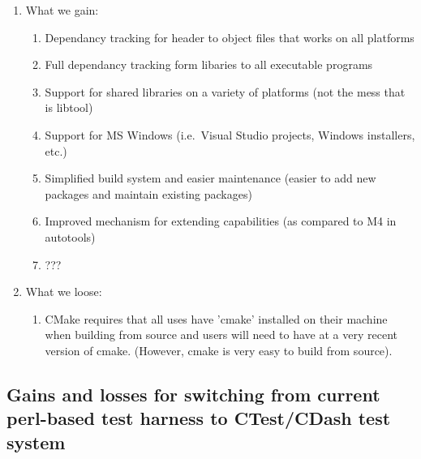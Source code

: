 \documentclass[pdf,ps2pdf,11pt]{SANDreport}
\begin{document}
\begin{enumerate}

{}\item What we gain:

  \begin{enumerate}

  {}\item Dependancy tracking for header to object files that works on
  all platforms

  {}\item Full dependancy tracking form libaries to all executable
  programs

  {}\item Support for shared libraries on a variety of platforms (not
  the mess that is libtool)

  {}\item Support for MS Windows (i.e.\ Visual Studio projects,
  Windows installers, etc.)

  {}\item Simplified build system and easier maintenance (easier to
  add new packages and maintain existing packages)

  {}\item Improved mechanism for extending capabilities (as compared
  to M4 in autotools)

  {}\item ???

  \end{enumerate}

{}\item What we loose:

  \begin{enumerate}

  {}\item CMake requires that all uses have 'cmake' installed on their
  machine when building from source and users will need to have at a
  very recent version of cmake. (However, cmake is very easy to build
  from source).

  \end{enumerate}

\end{enumerate}


%
\subsection{Gains and losses for switching from current perl-based test
harness to CTest/CDash test system}
%
\end{document}
